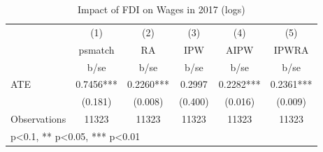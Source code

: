 \begin{table}[htbp]\centering
\def\sym#1{\ifmmode^{#1}\else\(^{#1}\)\fi}
\caption{Impact of FDI on Wages in 2017 (logs) }
\label{ates_wag}
\begin{tabular}{l*{5}{c}}
\hline\hline
                &\multicolumn{1}{c}{(1)}&\multicolumn{1}{c}{(2)}&\multicolumn{1}{c}{(3)}&\multicolumn{1}{c}{(4)}&\multicolumn{1}{c}{(5)}\\
                &\multicolumn{1}{c}{psmatch}&\multicolumn{1}{c}{RA}&\multicolumn{1}{c}{IPW}&\multicolumn{1}{c}{AIPW}&\multicolumn{1}{c}{IPWRA}\\
                &     b/se   &     b/se   &     b/se   &     b/se   &     b/se   \\
\hline
ATE             &   0.7456***&   0.2260***&   0.2997   &   0.2282***&   0.2361***\\
                &  (0.181)   &  (0.008)   &  (0.400)   &  (0.016)   &  (0.009)   \\
\hline
Observations    &    11323   &    11323   &    11323   &    11323   &    11323   \\
\hline\hline
\multicolumn{6}{l}{\footnotesize * p<0.1, ** p<0.05, *** p<0.01}\\
\end{tabular}
\end{table}
